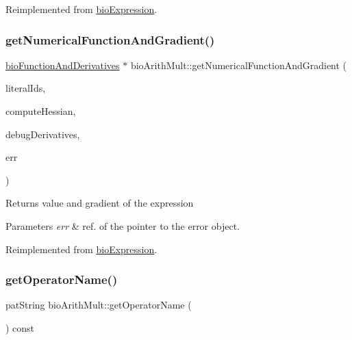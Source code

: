 Reimplemented from \hyperlink{classbio_expression_a3e4b4dca58dbbc6f0e411b30eb3f60b4}{bio\+Expression}.

\mbox{\label{classbio_arith_mult_a18612adf78adad46a0a19f2a57c4b32d}} 
\subsubsection{\texorpdfstring{get\+Numerical\+Function\+And\+Gradient()}{getNumericalFunctionAndGradient()}}
{\footnotesize\ttfamily \hyperlink{classbio_function_and_derivatives}{bio\+Function\+And\+Derivatives} $\ast$ bio\+Arith\+Mult\+::get\+Numerical\+Function\+And\+Gradient (\begin{DoxyParamCaption}\item[{vector$<$ pat\+U\+Long $>$}]{literal\+Ids,  }\item[{pat\+Boolean}]{compute\+Hessian,  }\item[{pat\+Boolean}]{debug\+Derivatives,  }\item[{pat\+Error $\ast$\&}]{err }\end{DoxyParamCaption})\hspace{0.3cm}{\ttfamily [virtual]}}

\begin{DoxyReturn}{Returns}
value and gradient of the expression 
\end{DoxyReturn}

\begin{DoxyParams}{Parameters}
{\em err} & ref. of the pointer to the error object. \\
\hline
\end{DoxyParams}


Reimplemented from \hyperlink{classbio_expression_a91c81ce80c9e972c913b10f5f3c1ed13}{bio\+Expression}.

\mbox{\label{classbio_arith_mult_aff182437fd5a1259cbc79fc7f8bc4956}} 
\subsubsection{\texorpdfstring{get\+Operator\+Name()}{getOperatorName()}}
{\footnotesize\ttfamily pat\+String bio\+Arith\+Mult\+::get\+Operator\+Name (\begin{DoxyParamCaption}{ }\end{DoxyParamCaption}) const\hspace{0.3cm}{\ttfamily [virtual]}}

